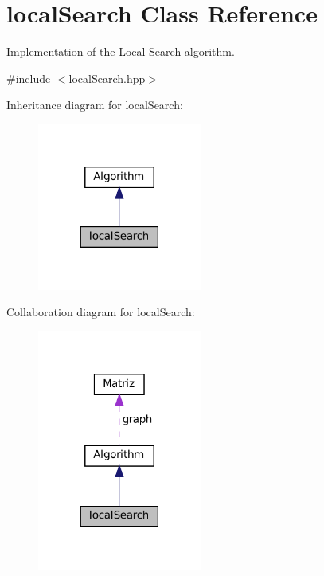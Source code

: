 \hypertarget{classlocalSearch}{}\section{local\+Search Class Reference}
\label{classlocalSearch}


Implementation of the Local Search algorithm.  




{\ttfamily \#include $<$local\+Search.\+hpp$>$}



Inheritance diagram for local\+Search\+:
\nopagebreak
\begin{figure}[H]
\begin{center}
\leavevmode
\includegraphics[width=153pt]{classlocalSearch__inherit__graph}
\end{center}
\end{figure}


Collaboration diagram for local\+Search\+:
\nopagebreak
\begin{figure}[H]
\begin{center}
\leavevmode
\includegraphics[width=153pt]{classlocalSearch__coll__graph}
\end{center}
\end{figure}
